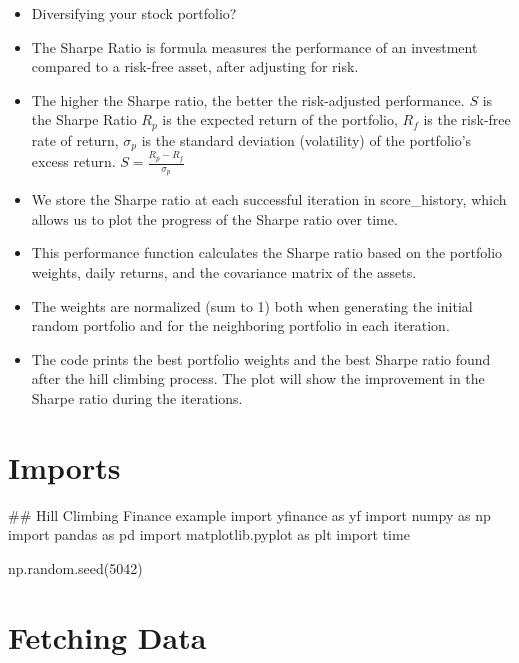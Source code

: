 \documentclass[
  letterpaper,
  DIV=11,
  numbers=noendperiod]{scrreprt}
\newenvironment{Shaded}{\begin{snugshade}}{\end{snugshade}}
\newcommand{\CommentTok}[1]{\textcolor[rgb]{0.37,0.37,0.37}{#1}}
\newcommand{\DecValTok}[1]{\textcolor[rgb]{0.68,0.00,0.00}{#1}}
\newcommand{\ImportTok}[1]{\textcolor[rgb]{0.00,0.46,0.62}{#1}}
\newcommand{\NormalTok}[1]{\textcolor[rgb]{0.00,0.23,0.31}{#1}}
\begin{document}
\begin{itemize}
\item
  Diversifying your stock portfolio?
\item
  The Sharpe Ratio is formula measures the performance of an investment
  compared to a risk-free asset, after adjusting for risk.
\item
  The higher the Sharpe ratio, the better the risk-adjusted performance.
  \(S\) is the Sharpe Ratio \(R_p\) is the expected return of the
  portfolio, \(R_f\) is the risk-free rate of return, \(\sigma_p\) is
  the standard deviation (volatility) of the portfolio's excess return.
  \(S = \frac{R_p - R_f}{\sigma_p}\)
\item
  We store the Sharpe ratio at each successful iteration in
  score\_history, which allows us to plot the progress of the Sharpe
  ratio over time.
\item
  This performance function calculates the Sharpe ratio based on the
  portfolio weights, daily returns, and the covariance matrix of the
  assets.
\item
  The weights are normalized (sum to 1) both when generating the initial
  random portfolio and for the neighboring portfolio in each iteration.
\item
  The code prints the best portfolio weights and the best Sharpe ratio
  found after the hill climbing process. The plot will show the
  improvement in the Sharpe ratio during the iterations.
\end{itemize}

\section{Imports}\label{imports-1}

\begin{Shaded}
\begin{Highlighting}[]
\CommentTok{\#\# Hill Climbing Finance example}
\ImportTok{import}\NormalTok{ yfinance }\ImportTok{as}\NormalTok{ yf}
\ImportTok{import}\NormalTok{ numpy }\ImportTok{as}\NormalTok{ np}
\ImportTok{import}\NormalTok{ pandas }\ImportTok{as}\NormalTok{ pd}
\ImportTok{import}\NormalTok{ matplotlib.pyplot }\ImportTok{as}\NormalTok{ plt}
\ImportTok{import}\NormalTok{ time}

\NormalTok{np.random.seed(}\DecValTok{5042}\NormalTok{)}
\end{Highlighting}
\end{Shaded}

\section{Fetching Data}\label{fetching-data}
\end{document}
